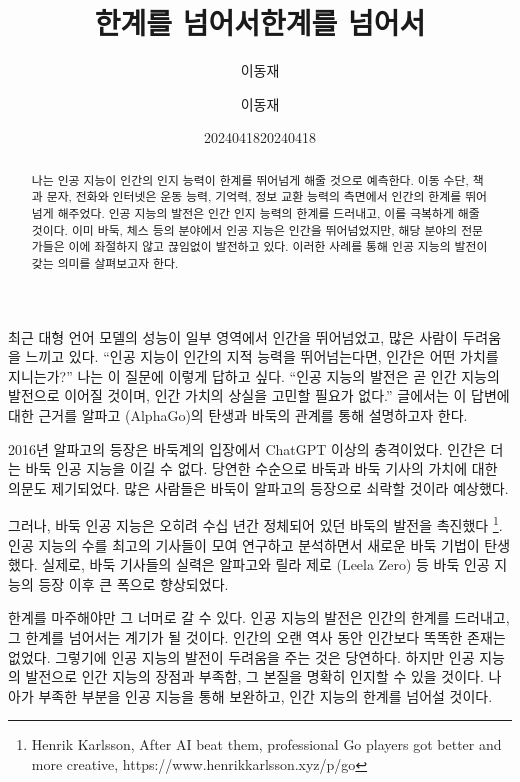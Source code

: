 \documentclass[11pt, oneside]{article}   	%
\title{한계를 넘어서}
\author{이동재}
\date{20240418}
\title{한계를 넘어서}
\author{이동재}
\date{20240418}
\begin{document}
\maketitle
\begin{abstract}
  나는 인공 지능이 인간의 인지 능력이 한계를 뛰어넘게 해줄 것으로 예측한다.
  이동 수단, 책과 문자, 전화와 인터넷은 운동 능력, 기억력, 정보 교환 능력의 측면에서 인간의 한계를 뛰어넘게 해주었다.
  인공 지능의 발전은 인간 인지 능력의 한계를 드러내고, 이를 극복하게 해줄 것이다.
  이미 바둑, 체스 등의 분야에서 인공 지능은 인간을 뛰어넘었지만, 해당 분야의 전문가들은 이에 좌절하지 않고 끊임없이 발전하고 있다.
  이러한 사례를 통해 인공 지능의 발전이 갖는 의미를 살펴보고자 한다.
\end{abstract}
최근 대형 언어 모델의 성능이 일부 영역에서 인간을 뛰어넘었고, 많은 사람이 두려움을 느끼고 있다.
``인공 지능이 인간의 지적 능력을 뛰어넘는다면, 인간은 어떤 가치를 지니는가?''
나는 이 질문에 이렇게 답하고 싶다. ``인공 지능의 발전은 곧 인간 지능의 발전으로 이어질 것이며, 인간 가치의 상실을 고민할 필요가 없다.''
글에서는 이 답변에 대한 근거를 알파고 (AlphaGo)의 탄생과 바둑의 관계를 통해 설명하고자 한다.

2016년 알파고의 등장은 바둑계의 입장에서 ChatGPT 이상의 충격이었다.
인간은 더는 바둑 인공 지능을 이길 수 없다. 당연한 수순으로 바둑과 바둑 기사의 가치에 대한 의문도 제기되었다.
많은 사람들은 바둑이 알파고의 등장으로 쇠락할 것이라 예상했다.

그러나, 바둑 인공 지능은 오히려 수십 년간 정체되어 있던 바둑의 발전을 촉진했다
\footnote{Henrik Karlsson, After AI beat them, professional Go players got better and more creative, https://www.henrikkarlsson.xyz/p/go}.
인공 지능의 수를 최고의 기사들이 모여 연구하고 분석하면서 새로운 바둑 기법이 탄생했다.
실제로, 바둑 기사들의 실력은 알파고와 릴라 제로 (Leela Zero) 등 바둑 인공 지능의 등장 이후 큰 폭으로 향상되었다.

한계를 마주해야만 그 너머로 갈 수 있다. 인공 지능의 발전은 인간의 한계를 드러내고, 그 한계를 넘어서는 계기가 될 것이다.
인간의 오랜 역사 동안 인간보다 똑똑한 존재는 없었다. 그렇기에 인공 지능의 발전이 두려움을 주는 것은 당연하다.
하지만 인공 지능의 발전으로 인간 지능의 장점과 부족함, 그 본질을 명확히 인지할 수 있을 것이다.
나아가 부족한 부분을 인공 지능을 통해 보완하고, 인간 지능의 한계를 넘어설 것이다.
\end{document}
